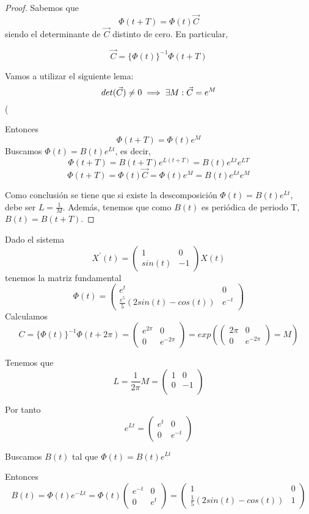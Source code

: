 \documentclass{mathnotes}
\begin{document}
\begin{proof}
Sabemos que $$\Phi(t+T) = \Phi(t)\vec{C}$$ siendo el determinante de $\vec{C}$ distinto de cero. En particular,

$$\vec{C} = \{ \Phi(t)\} ^{-1} \Phi(t+T)$$

Vamos a utilizar el siguiente lema:
$$det(\vec{C}) \neq 0 \implies \exists M : \vec{C} = e^M$$(

Entonces $$\Phi(t+T) = \Phi(t) e^M$$
Buscamos $\Phi(t) = B(t) e^{Lt}$, es decir, $$\Phi(t+T) = B(t+T) e^{L(t+T)} = B(t)e^{Lt}e^{LT}$$
$$\Phi(t+T) = \Phi(t)\vec{C} = \Phi(t)e^M=B(t)e^{Lt}e^M$$

Como conclusión se tiene que si existe la descomposición $\Phi(t) = B(t)e^{Lt}$, debe ser $L = \frac{1}{M}$. Además, tenemos que como $B(t)$ es periódica de periodo T, $B(t) = B(t+T)$.

\end{proof}

\begin{example}
Dado el sistema $$X^\prime(t) = \begin{pmatrix}
1 & 0\\sin(t) & -1
\end{pmatrix}X(t)$$
tenemos la matriz fundamental $$\Phi(t) = \begin{pmatrix}
e^t & 0\\\frac{e^5}{5}(2sin(t)-cos(t)) & e^{-t}
\end{pmatrix}$$
Calculamos 
$$C = \{ \Phi(t) \}^{-1}\Phi(t+2\pi) = \begin{pmatrix}
e^{2\pi} & 0\\0 & e^{-2\pi}
\end{pmatrix}  = exp(\begin{pmatrix}
2\pi & 0\\0 & e^{-2\pi}
\end{pmatrix} = M) $$

Tenemos que $$L = \frac{1}{2\pi}M = \begin{pmatrix}
1& 0\\ 0 &-1\\
\end{pmatrix}$$

Por tanto
$$e^{Lt} = \begin{pmatrix}
e^t & 0\\0 & e^{-t}
\end{pmatrix}$$

Buscamos $B(t)$ tal que $\Phi(t) = B(t)e^{Lt}$

Entonces
$$B(t) = \Phi(t)e^{-Lt} = \Phi(t) \begin{pmatrix}
e^{-t} & 0\\0 & e^t
\end{pmatrix} = \begin{pmatrix}
1 & 0\\
\frac{1}{5}(2sin(t)-cos(t)) & 1
\end{pmatrix}$$

\end{example}
\end{document}
